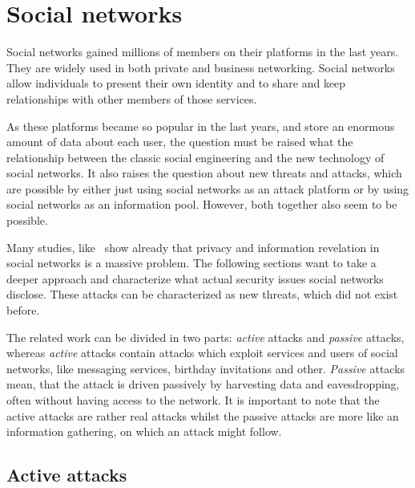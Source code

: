 \section{Social networks}

Social networks gained millions of members on their platforms in the last years.
They are widely used in both private and business networking. Social networks
allow individuals to present their own identity and to share and keep
relationships with other members of those services.

As these platforms became so popular in the last years, and store an enormous
amount of data about each user, the question must be raised what the
relationship between the classic social engineering and the new technology of
social networks. It also raises the question about new threats and attacks,
which are possible by either just using social networks as an attack platform
or by using social networks as an information pool. However, both together also
seem to be possible.

Many studies, like~\cite{fraunhofer2008,gross2005} show already that privacy
and information revelation in social networks is a massive problem. The following
sections want to take a deeper approach and characterize what actual security
issues social networks disclose. These attacks can be characterized as new
threats, which did not exist before. 

The related work can be divided in two parts: \textit{active} attacks and
\textit{passive} attacks, whereas \textit{active} attacks contain attacks
which exploit services and users of social networks, like messaging services,
birthday invitations and other. \textit{Passive} attacks mean, that the attack
is driven passively by harvesting data and eavesdropping, often without having
access to the network. It is important to note that the active attacks are
rather real attacks whilst the passive attacks are more like an information
gathering, on which an attack might follow.

\subsection{Active attacks}
\label{subsection:active_attacks}


